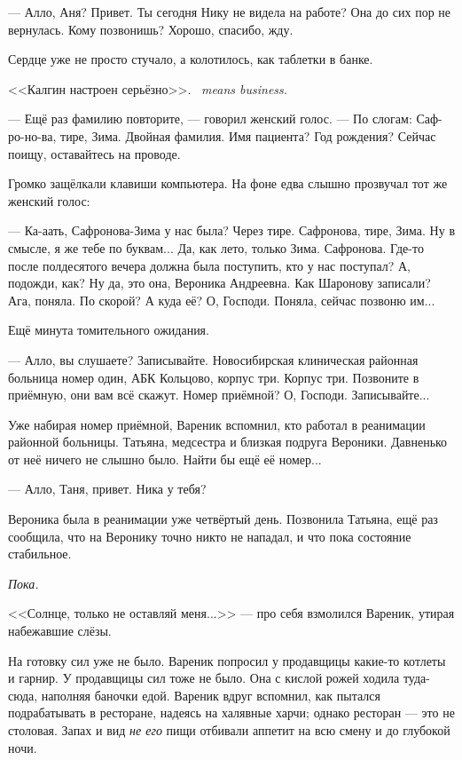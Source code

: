 --- Алло, Аня?
Привет.
Ты сегодня Нику не видела на работе?
Она до сих пор не вернулась.
Кому позвонишь?
Хорошо, спасибо, жду.

Сердце уже не просто стучало, а колотилось, как таблетки в банке.

{<<Калгин настроен серьёзно>>.}
{\textit{\Kalgin\ means business.}}

--- Ещё раз фамилию повторите, --- говорил женский голос.
--- По слогам: Саф-ро-но-ва, тире, Зима.
Двойная фамилия.
Имя пациента?
Год рождения?
Сейчас поищу, оставайтесь на проводе.

Громко защёлкали клавиши компьютера.
На фоне едва слышно прозвучал тот же женский голос:

--- Ка-аать, Сафронова-Зима у нас была?
Через тире.
Сафронова, тире, Зима.
Ну в смысле, я же тебе по буквам...
Да, как лето, только Зима.
Сафронова.
Где-то после полдесятого вечера должна была поступить, кто у нас поступал?
А, подожди, как?
Ну да, это она, Вероника Андреевна.
Как Шаронову записали?
Ага, поняла.
По скорой?
А куда её?
О, Господи.
Поняла, сейчас позвоню им...

Ещё минута томительного ожидания.

--- Алло, вы слушаете?
Записывайте.
Новосибирская клиническая районная больница номер один, АБК Кольцово, корпус три.
Корпус три.
Позвоните в приёмную, они вам всё скажут.
Номер приёмной?
О, Господи.
Записывайте...

Уже набирая номер приёмной, Вареник вспомнил, кто работал в реанимации районной больницы.
Татьяна, медсестра и близкая подруга Вероники.
Давненько от неё ничего не слышно было.
Найти бы ещё её номер...

--- Алло, Таня, привет.
Ника у тебя?

\asterism

\textspace

Вероника была в реанимации уже четвёртый день.
Позвонила Татьяна, ещё раз сообщила, что на Веронику точно никто не нападал, и что пока состояние стабильное.

\emph{Пока.}

<<Солнце, только не оставляй меня...>> --- про себя взмолился Вареник, утирая набежавшие слёзы.

На готовку сил уже не было.
Вареник попросил у продавщицы какие-то котлеты и гарнир.
У продавщицы сил тоже не было.
Она с кислой рожей ходила туда-сюда, наполняя баночки едой.
Вареник вдруг вспомнил, как пытался подрабатывать в ресторане, надеясь на халявные харчи;
однако ресторан --- это не столовая.
Запах и вид \emph{не его} пищи отбивали аппетит на всю смену и до глубокой ночи.

